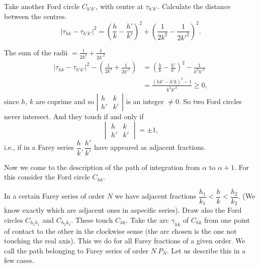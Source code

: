 Take another Ford circle $C_{h'k'}$, with centre at
$\tau_{h'k'}$. Calculate the distance between the centres.
$$
\left| \tau_{hk}- \tau_{h'k'} \right|^2= \left( \frac{h}{k}-
\frac{h'}{k'}\right)^2 + \left( \frac{1}{2k^2} - \frac{1}{2k'^2}\right)^2.
$$

The \pageoriginale sum of the radii $= \frac{1}{2 k^2} +
\frac{1}{2k'^2}$
\begin{align*}
  \left| \tau_{hk} - \tau_{h' k'} \right|^2 - \left( \frac{1}{2k^2} +
  \frac{1}{2k'^2} \right) & = \left( \frac{h}{k}-
  \frac{h'}{k'}\right)^2 - \frac{1}{k^2 h'^2}\\
  & = \frac{(h k' - h' k)^2-1}{k^2 k'^2} \geq 0,
\end{align*}
since $h$, $k$ are coprime and so $\left|\begin{smallmatrix} h &
k\\ h' & k'\end{smallmatrix}\right|$ is an integer $\neq 0$. So two
Ford circles never intersect. And they touch if and only if 
$$
\begin{vmatrix}
  h & k\\
  h' & k'
\end{vmatrix}= \pm 1,
$$
i.e., if in a Farey series $\dfrac{h}{k}, \dfrac{h'}{k'}$ have
appeared as adjacent fractions. 

Now we come to the description of the path of integration from
$\alpha$ to $\alpha + 1$. For this consider the Ford circle $C_{hk}$. 

\begin{figure}[H]
\end{figure}
In a certain Farey series of order $N$ we have adjacent fractions
$\dfrac{h_1}{k_1}< \dfrac{h}{k}< \dfrac{h_2}{k_2}$. (We know exactly
which are adjacent ones in a\pageoriginale specific series). Draw
also the Ford circles $C_{h_1 k_1}$ and $C_{h_2 k_2}$. These touch
$C_{hk}$. Take the arc $\gamma_{hk}$ of $C_{hk}$ from one point of
contact to the other in the clockwise sense (the arc chosen is the one
not touching the real axis). This we do for all Farey fractions of a
given order. We call the path belonging to Farey series of order $N
~P_N$. Let us describe this in a few cases. 

